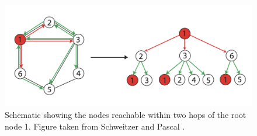 \begin{figure}
\includegraphics[width=\textwidth]{figs/tree_height_2.png}
\caption{Schematic showing the nodes reachable within two hops of the root node 1. Figure taken from Schweitzer and Pascal \cite{SchweitzerPASCAL2011}.}
\label{fig:tree}
\end{figure}
